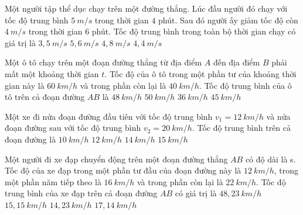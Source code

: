 \begin{vidu}
Một người tập thể dục chạy trên một đường thẳng. Lúc đầu người đó chạy với tốc độ trung bình $5\ m/s$ trong thời gian $4$ phút. Sau đó người ấy giảm tốc độ còn $4\ m/s$ trong thời gian $6$ phút. Tốc độ trung bình trong toàn bộ thời gian chạy có giá trị là
\choice
{$3,5\ m/s$}
{$5,6\ m/s$}
{$4,8\ m/s$}
{\True $4,4\ m/s$}
\end{vidu}
\begin{vidu}
Một ô tô chạy trên một đoạn đường thẳng từ địa điểm $A$ đến địa điểm $B$ phải mất một khoảng thời gian $t$. Tốc độ của ô tô trong một phần tư của khoảng thời gian này là $60\ km/h$ và trong phần còn lại là $40\ km/h$. Tốc độ trung bình của ô tô trên cả đoạn đường $AB$ là
\choice
{$48\ km/h$}
{$50\ km/h$}
{$36\ km/h$}
{\True $45\ km/h$}
\end{vidu}
\begin{vidu}%
Một xe đi nửa đoạn đường đầu tiên với tốc độ trung bình $v_1=12\ km/h$ và nửa đoạn đường sau với tốc độ trung bình $v_2=20\ km/h$. Tốc độ trung bình trên cả đoạn đường là
\choice
{$10\ km/h$}
{$12\ km/h$}
{$14\ km/h$}
{\True $15\ km/h$}
\end{vidu}
\begin{vidu}
Một người đi xe đạp chuyển động trên một đoạn đường thẳng $AB$ có độ dài là s. Tốc độ của xe đạp trong một phần tư đầu của đoạn đường này là $12\ km/h$, trong một phần năm tiếp theo là $16\ km/h$ và trong phần còn lại là $22\ km/h$. Tốc độ trung bình của xe đạp trên cả đoạn đường $AB$ có giá trị là
\choice
{$48,23\ km/h$}
{$15,15\ km/h$}
{$14,23\ km/h$}
{\True $17,14\ km/h$}
\end{vidu}




